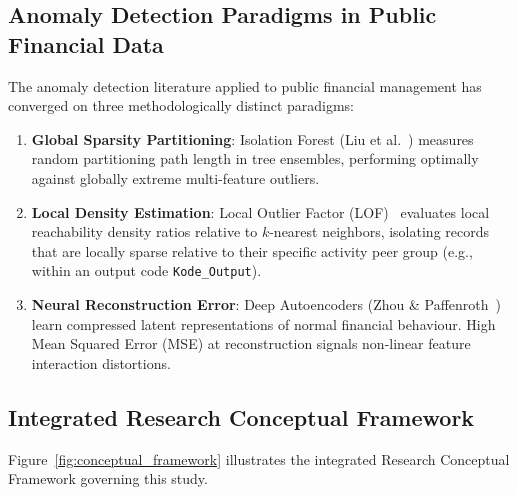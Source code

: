 \documentclass[runningheads]{llncs}
\begin{document}
\subsection{Anomaly Detection Paradigms in Public Financial Data}
The anomaly detection literature applied to public financial management has converged on three methodologically distinct paradigms:
\begin{enumerate}
    \item \textbf{Global Sparsity Partitioning}: Isolation Forest (Liu et al.~\cite{ref18,ref19}) measures random partitioning path length in tree ensembles, performing optimally against globally extreme multi-feature outliers.
    \item \textbf{Local Density Estimation}: Local Outlier Factor (LOF)~\cite{ref24} evaluates local reachability density ratios relative to $k$-nearest neighbors, isolating records that are locally sparse relative to their specific activity peer group (e.g., within an output code \texttt{Kode\_Output}).
    \item \textbf{Neural Reconstruction Error}: Deep Autoencoders (Zhou \& Paffenroth~\cite{ref32}) learn compressed latent representations of normal financial behaviour. High Mean Squared Error (MSE) at reconstruction signals non-linear feature interaction distortions.
\end{enumerate}

\subsection{Integrated Research Conceptual Framework}

Figure~\ref{fig:conceptual_framework} illustrates the integrated Research Conceptual Framework governing this study.
\end{document}

